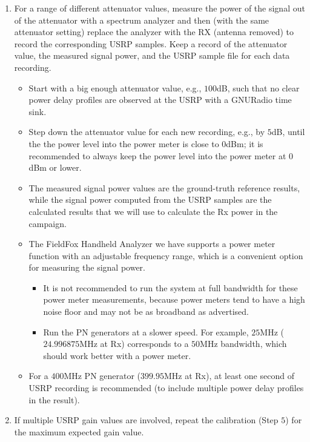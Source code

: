 \documentclass[12pt, draftcls, onecolumn]{IEEEtran}
\begin{document}
\begin{enumerate}
\begin{itemize}
        \end{itemize}
    \item For a range of different attenuator values, measure the power of the signal out of the attenuator with a spectrum analyzer and then (with the same attenuator setting) replace the analyzer with the RX (antenna removed) to record the corresponding USRP samples. Keep a record of the attenuator value, the measured signal power, and the USRP sample file for each data recording.
        \begin{itemize}
            \item Start with a big enough attenuator value, e.g., $100$dB, such that no clear power delay profiles are observed at the USRP with a GNURadio time sink.
            \item Step down the attenuator value for each new recording, e.g., by $5$dB, until the the power level into the power meter is close to $0$dBm; it is recommended to always keep the power level into the power meter at $0$dBm or lower.
            \item The measured signal power values are the ground-truth reference results, while the signal power computed from the USRP samples are the calculated results that we will use to calculate the Rx power in the campaign.
            \item The FieldFox Handheld Analyzer we have supports a power meter function with an adjustable frequency range, which is a convenient option for measuring the signal power.
            \begin{itemize}
                \item It is not recommended to run the system at full bandwidth for these power meter measurements, because power meters tend to have a high noise floor and may not be as broadband as advertised.
                \item Run the PN generators at a slower speed. For example, $25$MHz ($24.996875$MHz at Rx) corresponds to a $50$MHz bandwidth, which should work better with a power meter.
            \end{itemize}
            \item For a $400$MHz PN generator ($399.95$MHz at Rx), at least one second of USRP recording is recommended (to include multiple power delay profiles in the result).
        \end{itemize}
    \item If multiple USRP gain values are involved, repeat the calibration (Step $5$) for the maximum expected gain value.
\end{enumerate}
\end{document}
